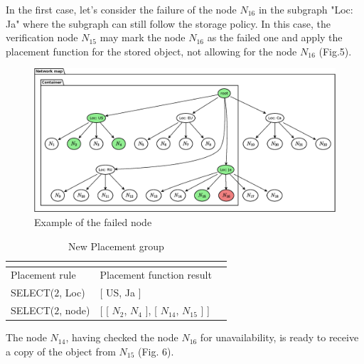 \documentclass[a4paper, 11pt]{article}
\begin{document}
\FloatBarrier 

In the first case, let's consider the failure of the node $ N_ {16} $ in
the subgraph "Loc: Ja" where the subgraph can still follow the storage policy.
In this case, the verification node $ N_ {15} $ may mark the node $ N_ {16} $ as
the failed one and apply the placement function for the stored object, not
allowing for the node $ N_ {16} $ (Fig.5).

\FloatBarrier 

\begin{figure}[!h]
\centering
\includegraphics[scale=.5]{pic/uml_9_rebalance_1.eps}
\caption{ Example of the failed node }
\end{figure}

\FloatBarrier 

\FloatBarrier 

\begin{table}[!h]
\begin{scriptsize}
\begin{tabular}{@{}|l|l|l|@{}}
\multicolumn{2}{l}{}                           \\ \midrule
Placement rule & Placement function result            \\ \midrule
SELECT($2$, Loc) &  [ US, Ja ] \\ \midrule
SELECT($2$, node) & \parbox{6cm}{ [ [ $N_2$, $N_4$ ], [ $N_{14}$, $N_{15}$ ] ] } \\ \bottomrule
\end{tabular}
\end{scriptsize}
\caption{New Placement group}
\end{table}
\FloatBarrier 

The node $N_{14}$, having checked the node $N_{16}$ for unavailability, is
ready to receive a copy of the object from $N_{15}$ (Fig. 6).

\FloatBarrier 
\end{document}
